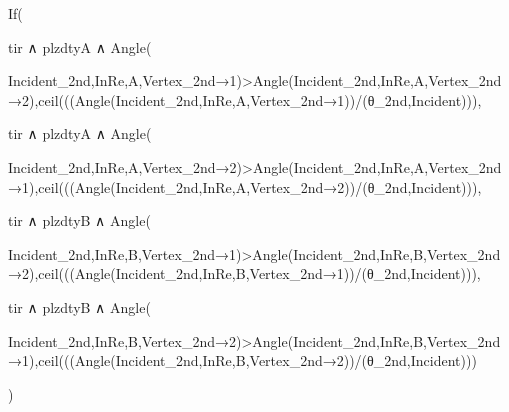 If(

  tir ∧ plzdtyA ∧ Angle(

    Incident_{2nd,InRe},A,Vertex_{2nd→1})>Angle(Incident_{2nd,InRe},A,Vertex_{2nd→2}),ceil(((Angle(Incident_{2nd,InRe},A,Vertex_{2nd→1}))/(θ_{2nd,Incident}))),

  tir ∧ plzdtyA ∧ Angle(
    
    Incident_{2nd,InRe},A,Vertex_{2nd→2})>Angle(Incident_{2nd,InRe},A,Vertex_{2nd→1}),ceil(((Angle(Incident_{2nd,InRe},A,Vertex_{2nd→2}))/(θ_{2nd,Incident}))),

  tir ∧ plzdtyB ∧ Angle(

    Incident_{2nd,InRe},B,Vertex_{2nd→1})>Angle(Incident_{2nd,InRe},B,Vertex_{2nd→2}),ceil(((Angle(Incident_{2nd,InRe},B,Vertex_{2nd→1}))/(θ_{2nd,Incident}))),

  tir ∧ plzdtyB ∧ Angle(

    Incident_{2nd,InRe},B,Vertex_{2nd→2})>Angle(Incident_{2nd,InRe},B,Vertex_{2nd→1}),ceil(((Angle(Incident_{2nd,InRe},B,Vertex_{2nd→2}))/(θ_{2nd,Incident})))

  )